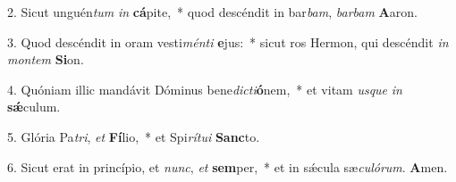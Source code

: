 2. Sicut unguén\textit{tum} \textit{in} \textbf{cá}pite,~*  quod descéndit in bar\textit{bam}, \textit{bar}\textit{bam} \textbf{A}aron.\

3. Quod descéndit in oram vesti\textit{mén}\textit{ti} \textbf{e}jus:~*  sicut ros Hermon, qui descéndit \textit{in} \textit{mon}\textit{tem} \textbf{Si}on.\

4. Quóniam illic mandávit Dóminus bene\textit{dic}\textit{ti}\textbf{ó}nem,~*  et vitam \textit{us}\textit{que} \textit{in} \textbf{sǽ}culum.\

5. Glória Pa\textit{tri}, \textit{et} \textbf{Fí}lio,~*  et Spi\textit{rí}\textit{tu}\textit{i} \textbf{Sanc}to.\

6. Sicut erat in princípio, et \textit{nunc}, \textit{et} \textbf{sem}per,~*  et in sǽcula sæ\textit{cu}\textit{ló}\textit{rum}. \textbf{A}men.\

